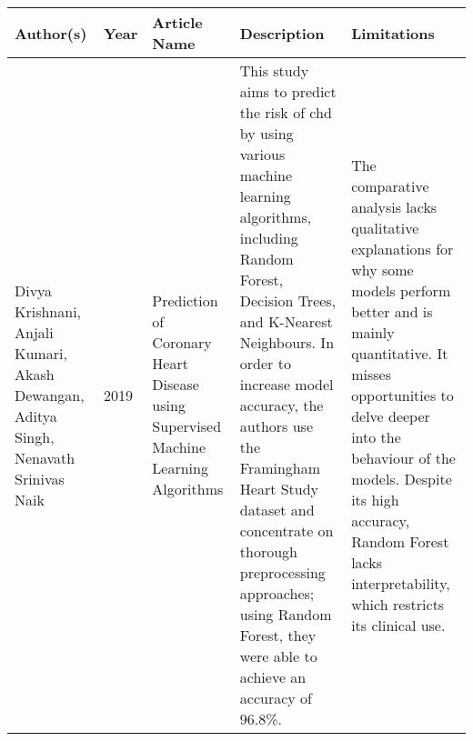 \begin{longtable}{p{2.3cm}p{1cm}p{3cm}p{5.2cm}p{4.5cm}}
\hline
\textbf{Author(s)} & \textbf{Year} & \textbf{Article Name} & \textbf{Description} & \textbf{Limitations} \\
\hline
Divya Krishnani, Anjali Kumari, Akash Dewangan, Aditya Singh, Nenavath Srinivas Naik & 2019 & Prediction of Coronary Heart Disease using Supervised Machine Learning Algorithms & This study aims to predict the risk of \gls{chd} by using various machine learning algorithms, including Random Forest, Decision Trees, and K-Nearest Neighbours. In order to increase model accuracy, the authors use the Framingham Heart Study dataset and concentrate on thorough preprocessing approaches; using Random Forest, they were able to achieve an accuracy of 96.8\%. & The comparative analysis lacks qualitative explanations for why some models perform better and is mainly quantitative. It misses opportunities to delve deeper into the behaviour of the models. Despite its high accuracy, Random Forest lacks interpretability, which restricts its clinical use.\\ \hline


\end{longtable}
